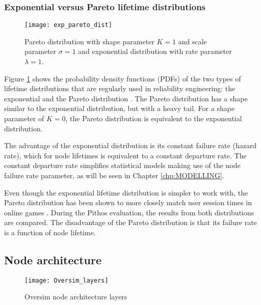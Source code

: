 \subsubsection{Exponential versus Pareto lifetime distributions}
\label{exp_vs_pareto}

\begin{figure}[htbp]
 \centering
 \texttt{[image: exp\_pareto\_dist]}
 \caption{Pareto distribution with shape parameter $K=1$ and scale parameter $\sigma=1$ and exponential distribution with rate parameter $\lambda=1$.}
 \label{fig_exp_pareto_dists}
\end{figure}
%
Figure \ref{fig_exp_pareto_dists} shows the probability density functions (PDFs) of the two types of lifetime distributions that are regularly used in reliability engineering: the exponential and the Pareto distribution \cite{rausand2004systemreliability}. The Pareto distribution has a shape similar to the exponential distribution, but with a heavy tail. For a shape parameter of $K=0$, the Pareto distribution is equivalent to the exponential distribution.

The advantage of the exponential distribution is its constant failure rate (hazard rate), which for node lifetimes is equivalent to a constant departure rate. The constant departure rate simplifies statistical models making use of the node failure rate parameter, as will be seen in Chapter \ref{chp:MODELLING}.

Even though the exponential lifetime distribution is simpler to work with, the Pareto distribution has been shown to more closely match user session times in online games \cite{Kwok_dist_match}. During the Pithos evaluation, the results from both distributions are compared. The disadvantage of the Pareto distribution is that its failure rate is a function of node lifetime.

\subsection{Node architecture}

\begin{figure}[htbp]
 \centering
 \texttt{[image: Oversim\_layers]}
 \caption{Oversim node architecture layers}
 \label{fig_oversim_layers}
\end{figure}


